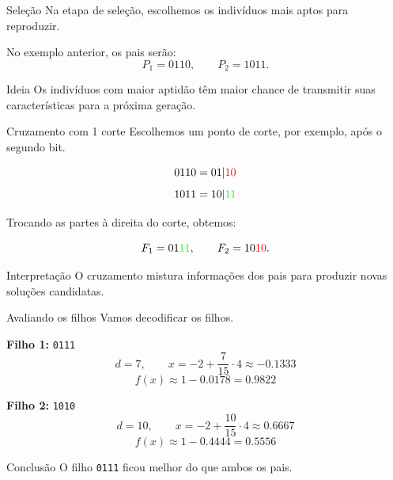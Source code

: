 \documentclass[mathserif, 10pt]{beamer}
\newcommand{\tred}[1]{\textcolor{red}{#1}}
\begin{document}
\begin{frame}{Seleção}
	Na etapa de seleção, escolhemos os indivíduos mais aptos para reproduzir.
	
	\pause
	
	No exemplo anterior, os pais serão:
	\[
	P_1=0110,
	\qquad
	P_2=1011.
	\]
	
	\pause
	
	\begin{block}{Ideia}
		Os indivíduos com maior aptidão têm maior chance de transmitir suas características para a próxima geração.
	\end{block}
\end{frame}

\begin{frame}{Cruzamento com 1 corte}
	Escolhemos um ponto de corte, por exemplo, após o segundo bit.
	
	\[
	0110 = 01|\tred{10}
	\]
	\[
	1011 = 10|\textcolor{green}{11}
	\]
	
	\pause
	
	Trocando as partes à direita do corte, obtemos:
	
	\[
	F_1=01\textcolor{green}{11},
	\qquad
	F_2=10\tred{10}.
	\]
	
	\pause
	
	\begin{block}{Interpretação}
		O cruzamento mistura informações dos pais para produzir novas soluções candidatas.
	\end{block}
\end{frame}

\begin{frame}{Avaliando os filhos}
	Vamos decodificar os filhos.
	
	\pause
	
	\textbf{Filho 1:} \texttt{0111}
	\[
	d=7,\qquad
	x=-2+\frac{7}{15}\cdot 4\approx -0.1333
	\]
	\[
	f(x)\approx 1-0.0178=0.9822
	\]
	
	\pause
	
	\textbf{Filho 2:} \texttt{1010}
	\[
	d=10,\qquad
	x=-2+\frac{10}{15}\cdot 4\approx 0.6667
	\]
	\[
	f(x)\approx 1-0.4444=0.5556
	\]
	
	\pause
	
	\begin{alertblock}{Conclusão}
		O filho \texttt{0111} ficou melhor do que ambos os pais.
	\end{alertblock}
\end{frame}
\end{document}
